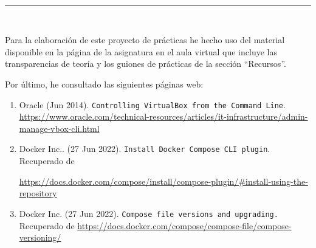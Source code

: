  \newpage
 \begin{center}
	{\fboxrule=4pt } \\
	\rule{15cm}{0pt} \\
\end{center}
\par Para la elaboración de este proyecto de prácticas he hecho uso del material disponible en la página de la asignatura en el aula virtual que incluye
las transparencias de teoría y los guiones de prácticas de la sección ``Recursos''.
\par Por último, he consultado las siguientes páginas web:
\begin{enumerate}
	\item Oracle (Jun 2014). \texttt{Controlling VirtualBox from the Command Line}.
	\url{https://www.oracle.com/technical-resources/articles/it-infrastructure/admin-manage-vbox-cli.html}
	\item Docker Inc.. (27 Jun 2022). \texttt{Install Docker Compose CLI plugin}. Recuperado de 
	\raggedright\url{https://docs.docker.com/compose/install/compose-plugin/#install-using-the-repository}
	\item Docker Inc. (27 Jun 2022). \texttt{Compose file versions and upgrading.} Recuperado de 
	\url{https://docs.docker.com/compose/compose-file/compose-versioning/}
\end{enumerate}

